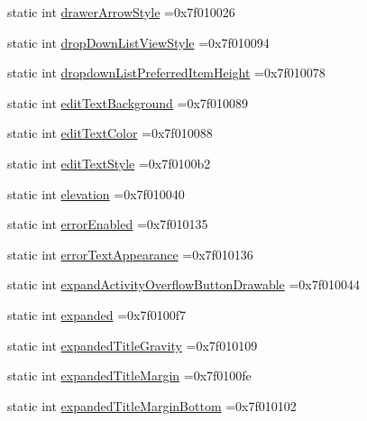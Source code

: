 \begin{DoxyCompactItemize}
static int \hyperlink{classandroid_1_1support_1_1v7_1_1recyclerview_1_1R_1_1attr_a5f7cfa2a2986808f52988cb9978f4e6a}{drawer\+Arrow\+Style} =0x7f010026
\item 
static int \hyperlink{classandroid_1_1support_1_1v7_1_1recyclerview_1_1R_1_1attr_afa306615c822ff20ead7cb5283f85816}{drop\+Down\+List\+View\+Style} =0x7f010094
\item 
static int \hyperlink{classandroid_1_1support_1_1v7_1_1recyclerview_1_1R_1_1attr_a800c7c41bcf94e57e9976a614015fa3f}{dropdown\+List\+Preferred\+Item\+Height} =0x7f010078
\item 
static int \hyperlink{classandroid_1_1support_1_1v7_1_1recyclerview_1_1R_1_1attr_aaf67b9943713c3544f8bfb157df4bcaf}{edit\+Text\+Background} =0x7f010089
\item 
static int \hyperlink{classandroid_1_1support_1_1v7_1_1recyclerview_1_1R_1_1attr_a9c71256b0ecbe9926f09bfc5a70c86c8}{edit\+Text\+Color} =0x7f010088
\item 
static int \hyperlink{classandroid_1_1support_1_1v7_1_1recyclerview_1_1R_1_1attr_a89e634f48f0aa69c6b3b9dd20ba8135d}{edit\+Text\+Style} =0x7f0100b2
\item 
static int \hyperlink{classandroid_1_1support_1_1v7_1_1recyclerview_1_1R_1_1attr_ae22f31865d59869b52d58f378c23859b}{elevation} =0x7f010040
\item 
static int \hyperlink{classandroid_1_1support_1_1v7_1_1recyclerview_1_1R_1_1attr_aa8e357728067c438e31fa8011f19b027}{error\+Enabled} =0x7f010135
\item 
static int \hyperlink{classandroid_1_1support_1_1v7_1_1recyclerview_1_1R_1_1attr_af4f2acb86357350cfe03ffde9fbf6ee6}{error\+Text\+Appearance} =0x7f010136
\item 
static int \hyperlink{classandroid_1_1support_1_1v7_1_1recyclerview_1_1R_1_1attr_a9ddcb299cd05d9654baacc4909328256}{expand\+Activity\+Overflow\+Button\+Drawable} =0x7f010044
\item 
static int \hyperlink{classandroid_1_1support_1_1v7_1_1recyclerview_1_1R_1_1attr_af3a8b0935266312d3a1f395a62bb97d2}{expanded} =0x7f0100f7
\item 
static int \hyperlink{classandroid_1_1support_1_1v7_1_1recyclerview_1_1R_1_1attr_a2bfaddfa25b0ae1fa133581b7b158899}{expanded\+Title\+Gravity} =0x7f010109
\item 
static int \hyperlink{classandroid_1_1support_1_1v7_1_1recyclerview_1_1R_1_1attr_a6eac3614b0b87eeb62f7211fcc408131}{expanded\+Title\+Margin} =0x7f0100fe
\item 
static int \hyperlink{classandroid_1_1support_1_1v7_1_1recyclerview_1_1R_1_1attr_a99518f07bfbc14a31c398bdb1b9a873d}{expanded\+Title\+Margin\+Bottom} =0x7f010102

\end{DoxyCompactItemize}
